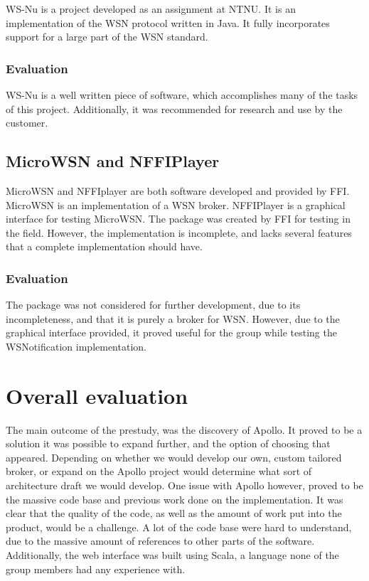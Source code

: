 WS-Nu is a project developed as an assignment at NTNU. It is an implementation of the WSN protocol written in Java. It fully incorporates support for a large part of the WSN standard.

\subsubsection{Evaluation}

WS-Nu is a well written piece of software, which accomplishes many of the tasks of this project. Additionally, it was recommended for research and use by the customer.

\subsection{MicroWSN and NFFIPlayer}

MicroWSN and NFFIplayer are both software developed and provided by FFI. MicroWSN is an implementation of a WSN broker. NFFIPlayer is a graphical interface for testing MicroWSN. The package was created by FFI for testing in the field. However, the implementation is incomplete, and lacks several features that a complete implementation should have.

\subsubsection{Evaluation}

The package was not considered for further development, due to its incompleteness, and that it is purely a broker for WSN. However, due to the graphical interface provided, it proved useful for the group while testing the WSNotification implementation.

\section{Overall evaluation}

The main outcome of the prestudy, was the discovery of Apollo. It proved to be a solution it was possible to expand further, and the option of choosing that appeared. Depending on whether we would develop our own, custom tailored broker, or expand on the Apollo project would determine what sort of architecture draft we would develop. One issue with Apollo however, proved to be the massive code base and previous work done on the implementation. It was clear that the quality of the code, as well as the amount of work put into the product, would be a challenge. A lot of the code base were hard to understand, due to the massive amount of references to other parts of the software. Additionally, the web interface was built using Scala, a language none of the group members had any experience with.

